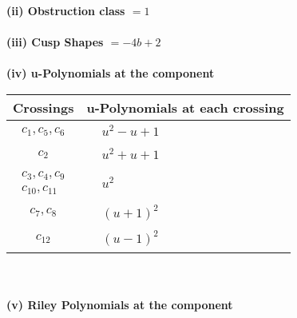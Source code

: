 \documentclass[1p]{elsarticle_modified}
\theoremstyle{definition}
\begin{document}
\flushleft \textbf{(ii) Obstruction class $= 1$}\\~\\
\flushleft \textbf{(iii) Cusp Shapes $= -4 b+2$}\\~\\
\newpage\renewcommand{\arraystretch}{1}
\flushleft \textbf{(iv) u-Polynomials at the component}\newline \\
\begin{tabular}{m{50pt}|m{274pt}}
Crossings & \hspace{64pt}u-Polynomials at each crossing \\
\hline $$\begin{aligned}c_{1},c_{5},c_{6}\end{aligned}$$&$\begin{aligned}
&u^2- u+1
\end{aligned}$\\
\hline $$\begin{aligned}c_{2}\end{aligned}$$&$\begin{aligned}
&u^2+u+1
\end{aligned}$\\
\hline $$\begin{aligned}c_{3},c_{4},c_{9}\\c_{10},c_{11}\end{aligned}$$&$\begin{aligned}
&u^2
\end{aligned}$\\
\hline $$\begin{aligned}c_{7},c_{8}\end{aligned}$$&$\begin{aligned}
&(u+1)^2
\end{aligned}$\\
\hline $$\begin{aligned}c_{12}\end{aligned}$$&$\begin{aligned}
&(u-1)^2
\end{aligned}$\\
\hline
\end{tabular}\\~\\
\newpage\renewcommand{\arraystretch}{1}
\flushleft \textbf{(v) Riley Polynomials at the component}\newline \\
\end{document}
